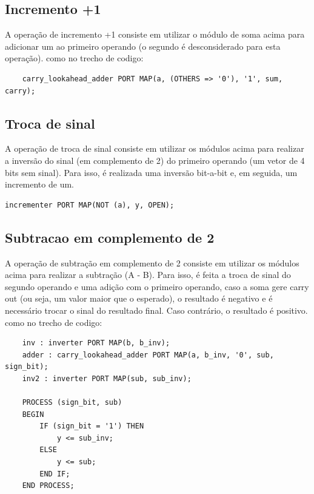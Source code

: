 \documentclass[12pt]{article}
\begin{document}
\subsection*{Incremento +1}

A operação de incremento +1 consiste em utilizar o módulo de soma acima para adicionar um ao primeiro operando (o segundo é desconsiderado para esta operação).
como no trecho de codigo:

\begin{verbatim}
    carry_lookahead_adder PORT MAP(a, (OTHERS => '0'), '1', sum, carry);
\end{verbatim}

\subsection{Troca de sinal}

A operação de troca de sinal consiste em utilizar os módulos acima para realizar a inversão do sinal (em complemento de 2) do primeiro operando (um vetor de 4 bits sem sinal). Para isso, é realizada uma inversão bit-a-bit e, em seguida, um incremento de um.

\begin{verbatim}
incrementer PORT MAP(NOT (a), y, OPEN);
\end{verbatim}

\subsection*{Subtracao em complemento de 2}

A operação de subtração em complemento de 2 consiste em utilizar os módulos acima para realizar a subtração (A - B). Para isso, é feita a troca de sinal do segundo operando e uma adição com o primeiro operando, caso a soma gere carry out (ou seja, um valor maior que o esperado), o resultado é negativo e é necessário trocar o sinal do resultado final. Caso contrário, o resultado é positivo.
como no trecho de codigo:

\begin{verbatim}
    inv : inverter PORT MAP(b, b_inv);
    adder : carry_lookahead_adder PORT MAP(a, b_inv, '0', sub, sign_bit);
    inv2 : inverter PORT MAP(sub, sub_inv);
    
    PROCESS (sign_bit, sub)
    BEGIN
        IF (sign_bit = '1') THEN
            y <= sub_inv;
        ELSE
            y <= sub;
        END IF;
    END PROCESS;
\end{verbatim}
\end{document}
